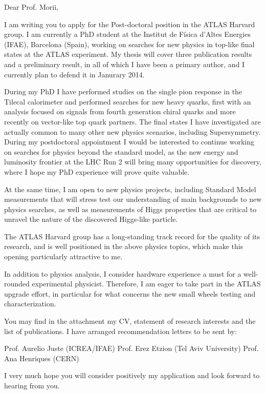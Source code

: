 Dear Prof. Morii,

I am writing you to apply for the Post-doctoral position in the ATLAS Harvard group.
I am currently a PhD student at the Institut de Física d'Altes Energies (IFAE),
Barcelona (Spain), working on searches for new physics in top-like final states at
the ATLAS experiment. My thesis will cover three publication results and a preliminary
result, in all of which I have been a primary author, and I currently plan to defend
it in Janurary 2014.

During my PhD I have performed studies on the single pion response in the Tilecal
calorimeter and performed searches for new heavy quarks, first with an analysis
focused on signals from fourth generation chiral quarks and more recently
on vector-like top quark partners. The final states I have investigated are actually
common to many other new physics scenarios, including Supersymmetry. During my
postdoctoral appointment I would be interested to continue working on searches
for physics beyond the standard model, as the new energy and luminosity frontier
at the LHC Run 2 will bring many opportunities for discovery, where I hope my PhD
experience will prove quite valuable.

At the same time, I am open to new physics projects, including Standard Model
measurements that will stress test our understanding of main backgrounds to new
physics searches, as well as measurements of Higgs properties that are critical to
unravel the nature of the discovered Higgs-like particle.

The ATLAS Harvard group has a long-standing track record for the quality of its
research, and is well positioned in the above physics topics, which make this
opening particularly attractive to me.

In addition to physics analysis, I consider hardware experience a must for a
well-rounded experimental physicist. Therefore, I am eager to take part in the
ATLAS upgrade effort, in particular for what concerns the new small wheels testing
and characterization.

You may find in the attachment my CV, statement of research interests and
the list of publications. I have arranged recommendation letters to be sent by:

Prof. Aurelio Juste (ICREA/IFAE)
Prof. Erez Etzion (Tel Aviv University)
Prof. Ana Henriques (CERN)

I very much hope you will consider positively my application and look forward
to hearing from you.

